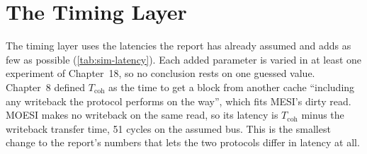 \section{The Timing Layer}
\label{sec:sim-timing}
\label{sec:sim-example}
%

The timing layer uses the latencies the report has already assumed and adds as few
as possible (\cref{tab:sim-latency}). Each added parameter is varied in at least one
experiment of Chapter~18, so no conclusion rests on one guessed value. Chapter~8
defined $T_{\mathrm{coh}}$ as the time to get a block from another cache
``including any writeback the protocol performs on the way'', which fits MESI's
dirty read. MOESI makes no writeback on the same read, so its latency is
$T_{\mathrm{coh}}$ minus the writeback transfer time, 51 cycles on the assumed bus.
This is the smallest change to the report's numbers that lets the two protocols
differ in latency at all.

